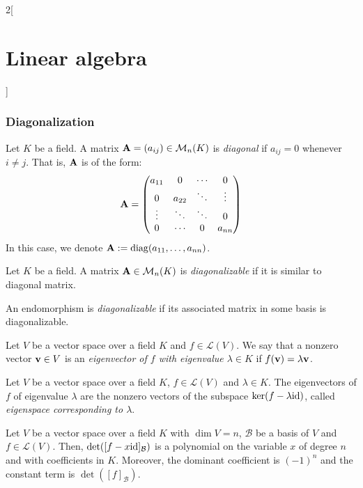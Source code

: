 \documentclass[../../../main.tex]{subfiles}
\begin{document}
\begin{multicols}{2}[\section{Linear algebra}]
  \subsubsection{Diagonalization}
  \begin{definition}
    Let $K$ be a field. A matrix $\boldsymbol{\mathrm{A}}=(a_{ij})\in\mathcal{M}_n(K)$ is \textit{diagonal} if $a_{ij}=0$ whenever $i\ne j$. That is, $\boldsymbol{\mathrm{A}}$ is of the form:
    $$\boldsymbol{\mathrm{A}}=
      \begin{pmatrix}
        a_{11} & 0      & \cdots & 0      \\
        0      & a_{22} & \ddots & \vdots \\
        \vdots & \ddots & \ddots & 0      \\
        0      & \cdots & 0      & a_{nn}
      \end{pmatrix}
    $$
    In this case, we denote $\boldsymbol{\mathrm{A}}:=\operatorname{diag}(a_{11},\ldots,a_{nn})$.
  \end{definition}
  \begin{definition}
    Let $K$ be a field. A matrix $\boldsymbol{\mathrm{A}}\in\mathcal{M}_n(K)$ is \textit{diagonalizable} if it is similar to diagonal matrix.
  \end{definition}
  \begin{definition}
    An endomorphism is \textit{diagonalizable} if its associated matrix in some basis is diagonalizable.
  \end{definition}
  \begin{definition}
    Let $V$ be a vector space over a field $K$ and $f\in\mathcal{L}(V)$. We say that a nonzero vector $\boldsymbol{\mathrm{v}}\in V$ is an \textit{eigenvector of $f$ with eigenvalue $\lambda\in K$} if $f(\boldsymbol{\mathrm{v}})=\lambda \boldsymbol{\mathrm{v}}$.
  \end{definition}
  \begin{lemma}
    Let $V$ be a vector space over a field $K$, $f\in\mathcal{L}(V)$ and $\lambda\in K$. The eigenvectors of $f$ of eigenvalue $\lambda$ are the nonzero vectors of the subspace $\ker(f-\lambda\mathrm{id})$, called \textit{eigenspace corresponding to $\lambda$}.
  \end{lemma}
  \begin{lemma}
    Let $V$ be a vector space over a field $K$ with $\dim V=n$, $\mathcal{B}$ be a basis of $V$ and $f\in\mathcal{L}(V)$. Then, $\det([f-x\mathrm{id}]_\mathcal{B})$ is a polynomial on the variable $x$ of degree $n$ and with coefficients in $K$. Moreover, the dominant coefficient is $(-1)^n$ and the constant term is $\det([f]_\mathcal{B})$.

\end{lemma}
\end{multicols}
\end{document}
